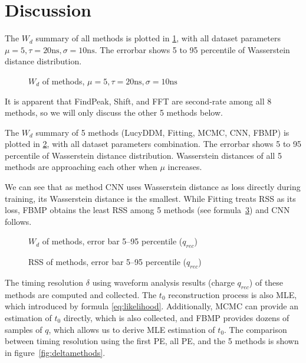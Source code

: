 \section{Discussion} %
\label{sec:discussion}

The $W_{d}$ summary of all methods is plotted in \ref{fig:chargesummary}, with all dataset parameters $\mu=5, \tau=20\mathrm{ns}, \sigma=10\mathrm{ns}$. The errorbar shows 5 to 95 percentile of Wasserstein distance distribution. 

\begin{figure}[H]
    \centering
    \scalebox{0.7}{}
    \caption{\label{fig:chargesummary} $W_{d}$ of methods, $\mu=5, \tau=20\mathrm{ns}, \sigma=10\mathrm{ns}$}
\end{figure}

It is apparent that FindPeak, Shift, and FFT are second-rate among all 8 methods, so we will only discuss the other 5 methods below. 


The $W_{d}$ summary of 5 methods (LucyDDM, Fitting, MCMC, CNN, FBMP) is plotted in \ref{fig:wdistsummary}, with all dataset parameters combination. The errorbar shows 5 to 95 percentile of Wasserstein distance distribution. Wasserstein distances of all 5 methods are approaching each other when $\mu$ increases. 

We can see that as method CNN uses Wasserstein distance as loss directly during training, its Wasserstein distance is the smallest. While Fitting treats RSS as its loss, FBMP obtains the least RSS among 5 methods (see formula~\ref{fig:rsssummary}) and CNN follows. 

\begin{figure}[H]
    \centering
    \resizebox{\textwidth}{!}{}
    \caption{\label{fig:wdistsummary} $W_{d}$ of methods, error bar 5--95 percentile ($q_{rec}$)}
\end{figure}

\begin{figure}[H]
    \centering
    \resizebox{\textwidth}{!}{}
    \caption{\label{fig:rsssummary} RSS of methods, error bar 5--95 percentile ($q_{rec}$)}
\end{figure}

The timing resolution $\delta$ using waveform analysis results (charge $q_{rec}$) of these methods are computed and collected. The $t_{0}$ reconstruction process is also MLE, which introduced by formula \eqref{eq:likelihood}. Additionally, MCMC can provide an estimation of $t_{0}$ directly, which is also collected, and FBMP provides dozens of samples of $q$, which allows us to derive MLE estimation of $t_{0}$. The comparison between timing resolution using the first PE, all PE, and the 5 methods is shown in figure~\ref{fig:deltamethods}. 

